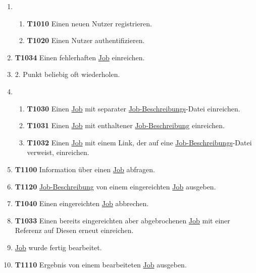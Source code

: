 \begin{enumerate}
    \item 
    \begin{enumerate}
        \item \textbf{T1010} Einen neuen \gls{Nutzer} registrieren.
        
        \item \textbf{T1020} Einen \gls{Nutzer} authentifizieren.
    \end{enumerate}
    
    \item \textbf{T1034} Einen fehlerhaften \hyperref[B:Jobs]{Job} einreichen.
    
    \item 2. Punkt beliebig oft wiederholen.
    
    \item 
    \begin{enumerate}
        \item \textbf{T1030} Einen \hyperref[B:Jobs]{Job} mit separater \hyperref[B:Job-Beschreibung]{Job-Beschreibungs}-Datei einreichen. 
        
        \item \textbf{T1031} Einen \hyperref[B:Jobs]{Job} mit enthaltener \hyperref[B:Job-Beschreibung]{Job-Beschreibung} einreichen.
        
        \item \textbf{T1032} Einen \hyperref[B:Jobs]{Job} mit einem Link, der auf eine \hyperref[B:Job-Beschreibung]{Job-Beschreibungs}-Datei verweist, einreichen.
    \end{enumerate}
    
    \item \textbf{T1100} Information über einen \hyperref[B:Jobs]{Job} abfragen.
    
    \item \textbf{T1120} \hyperref[B:Job-Beschreibung]{Job-Beschreibung} von einem eingereichten \hyperref[B:Jobs]{Job} ausgeben.
    
    \item \textbf{T1040} Einen eingereichten \hyperref[B:Jobs]{Job} abbrechen.
    
    \item \textbf{T1033} Einen bereits eingereichten aber abgebrochenen \hyperref[B:Jobs]{Job} mit einer Referenz auf Diesen erneut einreichen.
    
    \item \hyperref[B:Jobs]{Job} wurde fertig bearbeitet.
    
    \item \textbf{T1110} Ergebnis von einem bearbeiteten \hyperref[B:Jobs]{Job} ausgeben. 
    
\end{enumerate}

